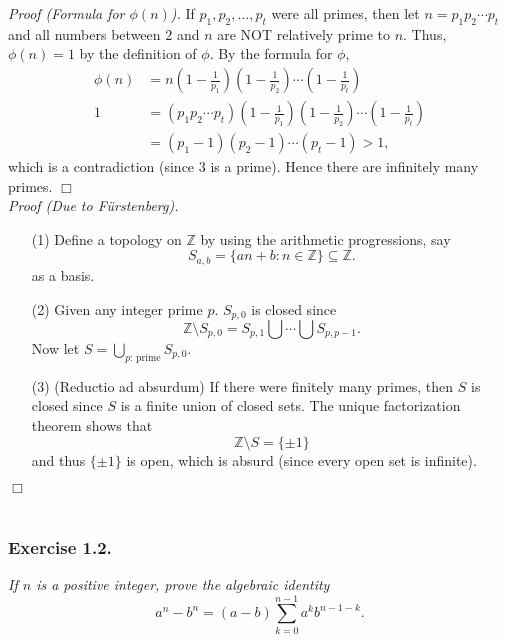 \documentclass{article}
\begin{document}
\emph{Proof (Formula for $\phi(n)$).}
If
$p_1, p_2, \ldots, p_t$ were all primes, then let
$n = p_1 p_2 \cdots p_t$ and all numbers between $2$ and $n$ are
NOT relatively prime to $n$.
Thus, $\phi(n) = 1$ by the definition of $\phi$.
By the formula for $\phi$,
\begin{align*}
  \phi(n)
  &= n
  \left( 1 - \frac{1}{p_1} \right)
  \left( 1 - \frac{1}{p_2} \right)
  \cdots
  \left( 1 - \frac{1}{p_t} \right) \\
  1
  &= (p_1 p_2 \cdots p_t)
  \left( 1 - \frac{1}{p_1} \right)
  \left( 1 - \frac{1}{p_2} \right)
  \cdots
  \left( 1 - \frac{1}{p_t} \right) \\
  &= (p_1 - 1)(p_2 - 1) \cdots (p_t - 1) > 1,
\end{align*}
which is a contradiction (since $3$ is a prime).
Hence there are infinitely many primes.
$\Box$ \\



\emph{Proof (Due to F\"urstenberg).}
\begin{enumerate}
\item[(1)]
  Define a topology on $\mathbb{Z}$ by using the arithmetic progressions, say
  \[
    S_{a,b} = \{ an+b : n \in \mathbb{Z} \} \subseteq \mathbb{Z}.
  \]
  as a basis.

\item[(2)]
  Given any integer prime $p$.
  $S_{p,0}$ is closed since
  \[
    \mathbb{Z} \setminus S_{p,0} = S_{p,1} \bigcup \cdots \bigcup S_{p,p-1}.
  \]
  Now let $S = \bigcup_{\text{$p$: prime}} S_{p,0}$.

\item[(3)]
  (Reductio ad absurdum)
  If there were finitely many primes, then $S$ is closed since $S$ is a finite union of closed sets.
  The unique factorization theorem shows that
  \[
    \mathbb{Z} \setminus S = \{ \pm 1 \}
  \]
  and thus $\{ \pm 1 \}$ is open, which is absurd
  (since every open set is infinite).
\end{enumerate}
$\Box$ \\\\






\subsubsection*{Exercise 1.2.}
\emph{If $n$ is a positive integer, prove the algebraic identity
$$a^n - b^n = (a - b) \sum_{k=0}^{n-1} a^k b^{n-1-k}.$$} \\
\end{document}
